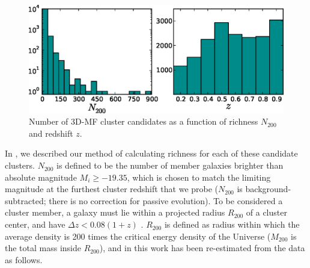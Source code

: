 \begin{figure}
\begin{center}
\vspace{0.5cm}
  \includegraphics[scale=0.9]{plots_ch4/hists_N200_z_NoGaps.eps}
  \caption[Richness and Redshift Distributions of \ac{3D-MF} Clusters]{Number of \ac{3D-MF} cluster candidates as a function of richness $N_{200}$ and redshift $z$.}
\label{plot:hists}
\end{center}
\end{figure}

In \citet{Ford14}, we described our method of calculating richness for each of these candidate clusters. $N_{200}$ is defined to be the number of member galaxies brighter than absolute magnitude $M_i \ge -19.35$, which is chosen to match the limiting magnitude at the furthest cluster redshift that we probe ($N_{200}$ is background-subtracted; there is no correction for passive evolution). To be considered a cluster member, a galaxy must lie within a projected radius $R_{200}$ of a cluster center, and have $\Delta z < 0.08(1+z)$ \citep[based on the photometric errors of the \ac{CFHTLenS} catalog; for details regarding $N_{200}$ see][]{Ford14}. $R_{200}$ is defined as radius within which the average density is 200 times the critical energy density of the Universe ($M_{200}$ is the total mass inside $R_{200}$), and in this work has been re-estimated from the data as follows. 

